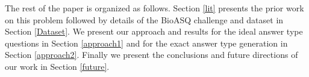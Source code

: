 \documentclass[11pt,a4paper]{article}
\begin{document}
    
    The rest of the paper is organized as follows. Section \ref{lit} presents the prior work on this problem followed by details of the BioASQ challenge and dataset in Section \ref{Dataset}. We present our approach and results for the ideal answer type questions in Section \ref{approach1} and for the exact answer type generation in Section \ref{approach2}. Finally we present the conclusions and future directions of our work in Section \ref{future}.
\end{document}

